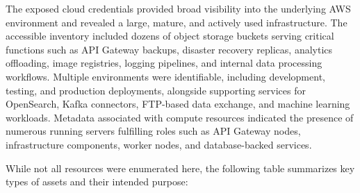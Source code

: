 \documentclass[12pt,a4paper]{report}
\begin{document}
The exposed cloud credentials provided broad visibility into the underlying AWS environment and revealed a large, mature, and actively used infrastructure. The accessible inventory included dozens of object storage buckets serving critical functions such as API Gateway backups, disaster recovery replicas, analytics offloading, image registries, logging pipelines, and internal data processing workflows. Multiple environments were identifiable, including development, testing, and production deployments, alongside supporting services for OpenSearch, Kafka connectors, FTP-based data exchange, and machine learning workloads. Metadata associated with compute resources indicated the presence of numerous running servers fulfilling roles such as API Gateway nodes, infrastructure components, worker nodes, and database-backed services.

While not all resources were enumerated here, the following table summarizes key types of assets and their intended purpose:
\end{document}
